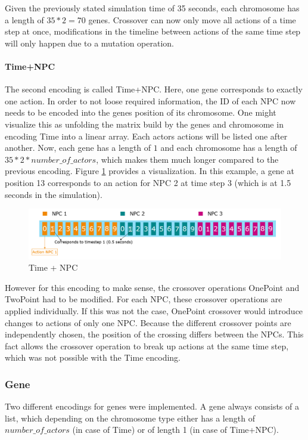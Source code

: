 Given the previously stated simulation time of 35 seconds, each chromosome has a length of $35 * 2 = 70$ genes.
Crossover can now only move all actions of a time step at once, modifications in the timeline between actions of the same time step will only happen due to a mutation operation.

\paragraph{Time+NPC}
The second encoding is called Time+NPC. Here, one gene corresponds to exactly one action. In order to not loose required information, the ID of each NPC now needs to be encoded into the genes position of its chromosome. One might visualize this as unfolding the matrix build by the genes and chromosome in encoding Time into a linear array. Each actors actions will be listed one after another. Now, each gene has a length of $1$ and each chromosome has a length of $35 * 2 * number\_of\_actors$, which makes them much longer compared to the previous encoding. Figure \ref{fig:implementation:encoding_chromosome_time_npc} provides a visualization. In this example, a gene at position 13 corresponds to an action for NPC 2 at time step 3 (which is at 1.5 seconds in the simulation).

\begin{figure}[ht] 
	\includegraphics[width=1\linewidth]{figures/time_npc_encoding}
	\caption{Time + NPC}
	\label{fig:implementation:encoding_chromosome_time_npc}
\end{figure}

However for this encoding to make sense, the crossover operations OnePoint and TwoPoint had to be modified. For each NPC, these crossover operations are applied individually. If this was not the case, OnePoint crossover would introduce changes to actions of only one NPC. Because the different crossover points are independently chosen, the position of the crossing differs between the NPCs. This fact allows the crossover operation to break up actions at the same time step, which was not possible with the Time encoding.

\subsubsection{Gene}
Two different encodings for genes were implemented. A gene always consists of a list, which depending on the chromosome type either has a length of $number\_of\_actors$ (in case of Time) or of length 1 (in case of Time+NPC). 

